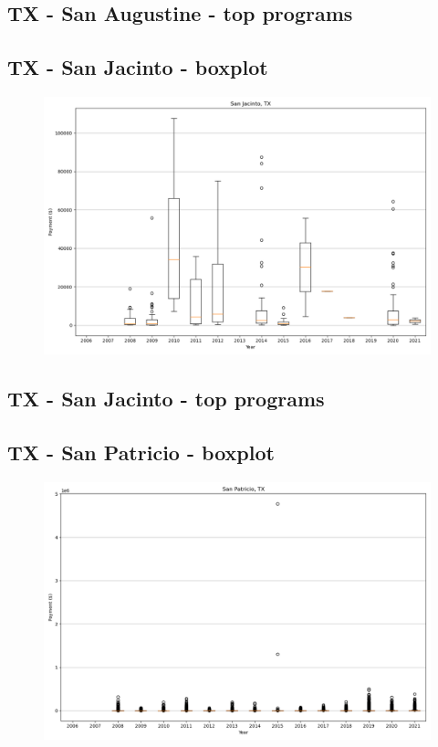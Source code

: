 \subsection*{TX - San Augustine - top programs}

\newpage
\subsection*{TX - San Jacinto - boxplot}
\begin{figure}[h]
\centering
\includegraphics[width=7in]{../output/boxplots/counties/San Jacinto-TX_boxplot.png}
\end{figure}


\subsection*{TX - San Jacinto - top programs}

\newpage
\subsection*{TX - San Patricio - boxplot}
\begin{figure}[h]
\centering
\includegraphics[width=7in]{../output/boxplots/counties/San Patricio-TX_boxplot.png}
\end{figure}



